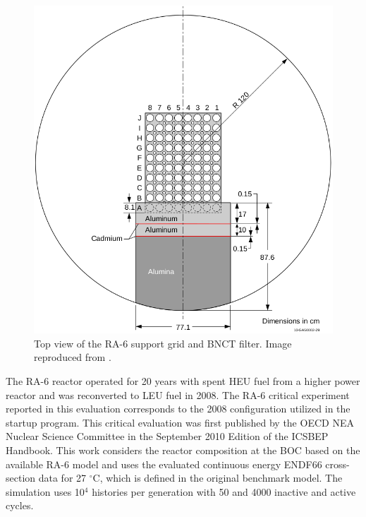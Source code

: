 \documentclass{style/nseJournal}
\begin{document}
\begin{figure}[htbp!] %
    \centering
    \includegraphics[width=0.70\linewidth]{figures/bnct}
    \hfill
    \caption{Top view of the RA-6 support grid and BNCT filter. Image reproduced from \cite{ICSBEP}.}
    \label{fig:ra6-2}
\end{figure}

The RA-6 reactor operated for 20 years with spent \gls*{HEU} fuel from a higher power reactor and was reconverted to \gls*{LEU} fuel in 2008.
The RA-6 critical experiment reported in this evaluation corresponds to the 2008 configuration utilized in the startup program.
This critical evaluation was first published by the OECD NEA Nuclear Science Committee in the September 2010 Edition of the ICSBEP Handbook.
This work considers the reactor composition at the \gls*{BOC} based on the available RA-6 model and uses the evaluated continuous energy ENDF66 cross-section data for 27 $^{\circ}$C, which is defined in the original benchmark model.
The simulation uses 10$^4$ histories per generation with 50 and 4000 inactive and active cycles.
\end{document}
